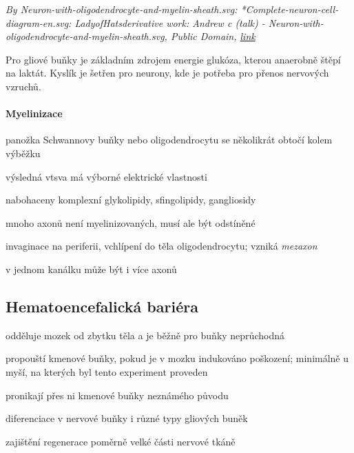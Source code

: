 \documentclass[DIV=8]{scrreprt}
\begin{document}
\emph{By Neuron-with-oligodendrocyte-and-myelin-sheath.svg: *Complete-neuron-cell-diagram-en.svg: LadyofHatsderivative work: Andrew c (talk) - Neuron-with-oligodendrocyte-and-myelin-sheath.svg, Public Domain, \href{https://commons.wikimedia.org/w/index.php?curid=10888009}{link}}


Pro gliové buňky je základním zdrojem energie glukóza, kterou anaerobně štěpí na laktát. Kyslík je šetřen pro neurony, kde je potřeba pro přenos nervových vzruchů.

\paragraph{Myelinizace}
\begin{myItemize}[nosep]
    \item panožka Schwannovy buňky nebo oligodendrocytu se několikrát obtočí kolem výběžku
    \item výsledná vtsva má výborné elektrické vlastnosti
    \item nabohaceny komplexní glykolipidy, sfingolipidy, gangliosidy
    \item mnoho axonů není myelinizovaných, musí ale být odstíněné
\begin{myItemize}[nosep]
    \item invaginace na periferii, vchlípení do těla oligodendrocytu; vzniká \emph{mezaxon}
    \item v jednom kanálku může být i více axonů
\end{myItemize}

\end{myItemize}



\subsection{Hematoencefalická bariéra} \label{Hematoencefalická bariéra}


\begin{myItemize}[nosep]
    \item odděluje mozek od zbytku těla a je běžně pro buňky neprůchodná
    \item propouští kmenové buňky, pokud je v mozku indukováno poškození; minimálně u myší, na kterých byl tento experiment proveden
\begin{myItemize}[nosep]
    \item pronikají přes ni kmenové buňky neznámého původu
\begin{myItemize}[nosep]
    \item diferenciace v nervové buňky i různé typy gliových buněk
    \item zajištění regenerace poměrně velké části nervové tkáně
\end{myItemize}

\end{myItemize}

\end{myItemize}
\end{document}
